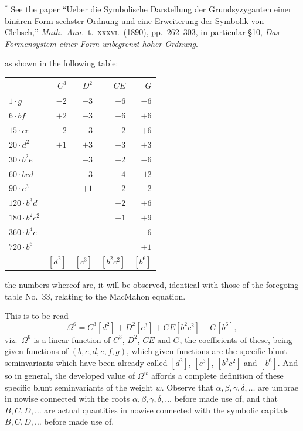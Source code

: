 \documentclass[11pt]{article}
\begin{document}
\noindent\footnotesize $^*$ See the paper ``Ueber die Symbolische Darstellung der Grundsyzyganten einer bin\"aren Form sechster Ordnung und eine Erweiterung der Symbolik von Clebsch,'' \textit{Math.\ Ann.}\ t.\ \textsc{xxxvi}.\ (1890), pp.\ 262--303, in particular \S 10, \textit{Das Formensystem einer Form unbegrenzt hoher Ordnung}.\normalsize

as shown in the following table:

\begin{center}
\begin{tabular}{l|rrrr}
 & $C^3$ & $D^2$ & $CE$ & $G$ \\
\hline
$1\cdot g$ & $-2$ & $-3$ & $+6$ & $-6$ \\
$6\cdot bf$ & $+2$ & $-3$ & $-6$ & $+6$ \\
$15\cdot ce$ & $-2$ & $-3$ & $+2$ & $+6$ \\
$20\cdot d^2$ & $+1$ & $+3$ & $-3$ & $+3$ \\
$30\cdot b^2 e$ & & $-3$ & $-2$ & $-6$ \\
$60\cdot bcd$ & & $-3$ & $+4$ & $-12$ \\
$90\cdot c^3$ & & $+1$ & $-2$ & $-2$ \\
$120\cdot b^3 d$ & & & $-2$ & $+6$ \\
$180\cdot b^2 c^2$ & & & $+1$ & $+9$ \\
$360\cdot b^4 c$ & & & & $-6$ \\
$720\cdot b^6$ & & & & $+1$ \\
\hline
& $[d^2]$ & $[c^3]$ & $[b^2 c^2]$ & $[b^6]$ \\
\end{tabular}
\end{center}

the numbers whereof are, it will be observed, identical with those of the foregoing table No.\ 33, relating to the MacMahon equation.

This is to be read
\[
\Omega^6 = C^3 [d^2] + D^2 [c^3] + CE [b^2 c^2] + G [b^6],
\]
viz.\ $\Omega^6$ is a linear function of $C^3$, $D^2$, $CE$ and $G$, the coefficients of these, being given functions of $(b, c, d, e, f, g)$, which given functions are the specific blunt seminvariants which have been already called $[d^2]$, $[c^3]$, $[b^2 c^2]$ and $[b^6]$. And so in general, the developed value of $\Omega^w$ affords a complete definition of these specific blunt seminvariants of the weight $w$. Observe that $\alpha, \beta, \gamma, \delta, \ldots$ are umbrae in nowise connected with the roots $\alpha, \beta, \gamma, \delta, \ldots$ before made use of, and that $B, C, D, \ldots$ are actual quantities in nowise connected with the symbolic capitals $B, C, D, \ldots$ before made use of.
\end{document}
